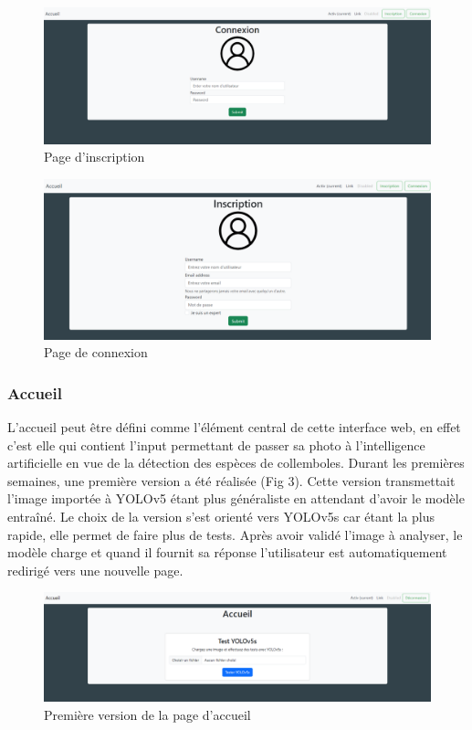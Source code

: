 \documentclass[
  10pt,
]{article}
\begin{document}
\begin{figure}[htbp]
\centering
\includegraphics[width=\textwidth]{img_rmd/fig1.png}
\caption{Page d'inscription}
\end{figure}

\begin{figure}[htbp]
\centering
\includegraphics[width=\textwidth]{img_rmd/fig2.png}
\caption{Page de connexion}
\end{figure}

\newpage

\subsubsection{Accueil}\label{accueil}

L'accueil peut être défini comme l'élément central de cette interface
web, en effet c'est elle qui contient l'input permettant de passer sa
photo à l'intelligence artificielle en vue de la détection des espèces
de collemboles. Durant les premières semaines, une première version a
été réalisée (Fig 3). Cette version transmettait l'image importée à
YOLOv5 étant plus généraliste en attendant d'avoir le modèle entraîné.
Le choix de la version s'est orienté vers YOLOv5s car étant la plus
rapide, elle permet de faire plus de tests. Après avoir validé l'image à
analyser, le modèle charge et quand il fournit sa réponse l'utilisateur
est automatiquement redirigé vers une nouvelle page.

\begin{figure}[htbp]
\centering
\includegraphics[width=\textwidth]{img_rmd/fig3.png}
\caption{Première version de la page d'accueil}
\end{figure}
\end{document}

